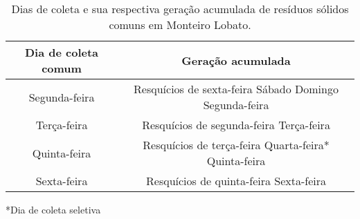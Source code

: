 \begin{table}[htbp]
\caption{Dias de coleta e sua respectiva geração acumulada de resíduos sólidos comuns em Monteiro Lobato.}
\begin{center}
\begin{tabular}{|c|c|}
\hline
\textbf{Dia de coleta comum} & \textbf{Geração acumulada} \\ \hline
Segunda-feira & Resquícios de sexta-feira
Sábado
Domingo
Segunda-feira \\ \hline
Terça-feira & Resquícios de segunda-feira
Terça-feira \\ \hline
Quinta-feira & Resquícios de terça-feira
Quarta-feira*
Quinta-feira \\ \hline
Sexta-feira & Resquícios de quinta-feira
Sexta-feira \\ \hline
\end{tabular}
*Dia de coleta seletiva
\end{center}
\label{tab:coleta_acumulada}
\end{table}
